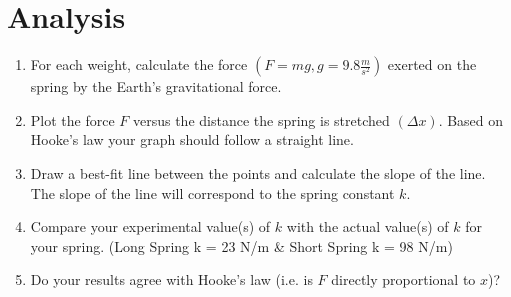 \chapter{Analysis}

\begin{enumerate}
  \item For each weight, calculate the force $(F = mg, g = 9.8\frac{m}{s^2})$ exerted on
        the spring by the Earth's gravitational force.

  \item Plot the force $F$ versus the distance the spring is stretched $(\Delta x)$.
        Based on Hooke's law your graph should follow a straight line.

  \item Draw a best-fit line between the points and calculate the slope of the line.
        The slope of the line will correspond to the spring constant $k$.

  \item Compare your experimental value(s) of $k$ with the actual value(s) of $k$ for 
        your spring. (Long Spring k = 23 N/m \& Short Spring k = 98 N/m)

  \item Do your results agree with Hooke's law (i.e. is $F$ directly proportional to 
        $x$)?
\end{enumerate}

